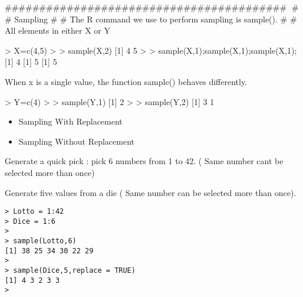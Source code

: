 #########################################
# 
# Sampling
# 
# The R command we use to perform sampling is sample().
# 
# All elements in either X or Y




> X=c(4,5)
>
> sample(X,2)
[1] 4 5
>
> sample(X,1);sample(X,1);sample(X,1);
[1] 4
[1] 5
[1] 5

When x is a single value, the function sample() behaves differently.

> Y=c(4)
>
> sample(Y,1)
[1] 2
> 
> sample(Y,2)
[1] 3 1


\begin{itemize}
\item Sampling With Replacement
\item Sampling Without Replacement
\end{itemize}
Generate a quick pick : pick 6 numbers from 1 to 42. ( Same number cant be selected more than once)

Generate five values from a die ( Same number can be selected more than once).

\begin{verbatim}
> Lotto = 1:42
> Dice = 1:6
> 
> sample(Lotto,6)
[1] 38 25 34 30 22 29
> 
> sample(Dice,5,replace = TRUE)
[1] 4 3 2 3 3
>
\end{verbatim}

